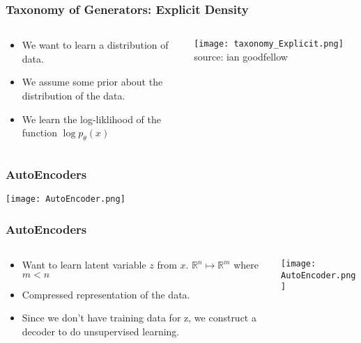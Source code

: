 \begin{frame}
    \frametitle{Taxonomy of Generators: Explicit Density}
    \begin{columns}
        \begin{column}{0.48\paperwidth}
            \begin{itemize}
                \item We want to learn a distribution of
                    data. 
                \item We assume some prior about the distribution of the data. 
                \item We learn the log-liklihood of the function $\log
                    p_\theta(x)$
            \end{itemize}
        \end{column}
        \begin{column}{0.48\paperwidth}
            \texttt{[image: taxonomy\_Explicit.png]}
            \null\hfill \tiny{source: ian goodfellow}
        \end{column}
    \end{columns}
\end{frame}

\begin{frame}
    \frametitle{AutoEncoders}
    \texttt{[image: AutoEncoder.png]}
\end{frame}


\begin{frame}
    \frametitle{AutoEncoders}
    \begin{columns}
        \begin{column}{0.48\paperwidth}
            \begin{itemize}
                \item Want to learn latent variable $z$ from $x$. $\mathbb{R}^n
                    \mapsto \mathbb{R}^m$ where $m<n$
                \item Compressed representation of the data.
                \item Since we don't have training data for z, we construct a
                    decoder to do unsupervised learning.
            \end{itemize}
        \end{column}
        \begin{column}{0.48\paperwidth}
            \texttt{[image: AutoEncoder.png]}
        \end{column}
    \end{columns}
\end{frame}

